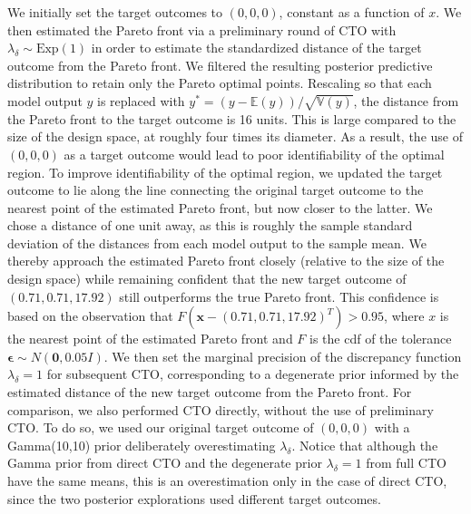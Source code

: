 \documentclass[12pt]{article}
\begin{document}
We initially set the target outcomes to $(0,0,0)$, constant as a function of $x$. 
%
We then estimated the Pareto front via a preliminary round of CTO with $\lambda_\delta\sim \mathrm{Exp}(1)$ in order to estimate the standardized distance of the target outcome from the Pareto front.
%
We filtered the resulting posterior predictive distribution to retain only the Pareto optimal points.
%
Rescaling so that each model output $y$ is replaced with $y^*=(y-\mathbb E(y))/\sqrt{\mathbb V(y)}$, the distance from the Pareto front to the target outcome is 16 units.
%
This is large compared to the size of the design space, at roughly four times its diameter.
%
As a result, the use of $(0,0,0)$ as a target outcome would lead to poor identifiability of the optimal region. 
%
%
To improve identifiability of the optimal region, we updated the target outcome to lie along the line connecting the original target outcome to the nearest point of the estimated Pareto front, but now closer to the latter.
%
We chose a distance of one unit away, as this is roughly the sample standard deviation of the distances from each model output to the sample mean.
%
We thereby approach the estimated Pareto front closely (relative to the size of the design space) while remaining confident that the new target outcome of $(0.71, 0.71, 17.92)$ still outperforms the true Pareto front.
%
This confidence is based on the observation that $F(\mathbf x-(0.71,0.71,17.92)^T)>0.95$, where $x$ is the nearest point of the estimated Pareto front and $F$ is the cdf of the tolerance $\boldsymbol\epsilon\sim	 N(\mathbf 0, 0.05I)$.
%
We then set the marginal precision of the discrepancy function $\lambda_\delta=1$ for subsequent CTO, corresponding to a degenerate prior informed by the estimated distance of the new target outcome from the Pareto front.
%
%
For comparison, we also performed CTO directly, without the use of preliminary CTO.
%
To do so, we used our original target outcome of $(0,0,0)$ with a Gamma(10,10) prior deliberately overestimating $\lambda_\delta$.
%
Notice that although the Gamma prior from direct CTO and the degenerate prior $\lambda_\delta=1$ from full CTO have the same means, this is an overestimation only in the case of direct CTO, since the two posterior explorations used different target outcomes.
\end{document}
